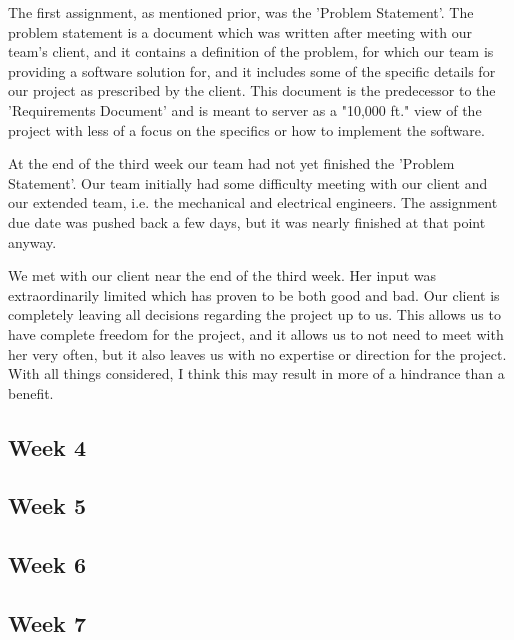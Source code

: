\documentclass[10pt,letterpaper,onecolumn,draftclsnofoot,journal]{IEEEtran}
\begin{document}
The first assignment, as mentioned prior, was the 'Problem Statement'. The problem statement is a document which was written after meeting with our team's client, and it contains a definition of the problem, for which our team is providing a software solution for, and it includes some of the specific details for our project as prescribed by the client. This document is the predecessor to the 'Requirements Document' and is meant to server as a "10,000 ft." view of the project with less of a focus on the specifics or how to implement the software. 

At the end of the third week our team had not yet finished the 'Problem Statement'. Our team initially had some difficulty meeting with our client and our extended team, i.e. the mechanical and electrical engineers. The assignment due date was pushed back a few days, but it was nearly finished at that point anyway. 

We met with our client near the end of the third week. Her input was extraordinarily limited which has proven to be both good and bad. Our client is completely leaving all decisions regarding the project up to us. This allows us to have complete freedom for the project, and it allows us to not need to meet with her very often, but it also leaves us with no expertise or direction for the project. With all things considered, I think this may result in more of a hindrance than a benefit.

\subsection{Week 4}


\subsection{Week 5}


\subsection{Week 6}


\subsection{Week 7}
\end{document}

